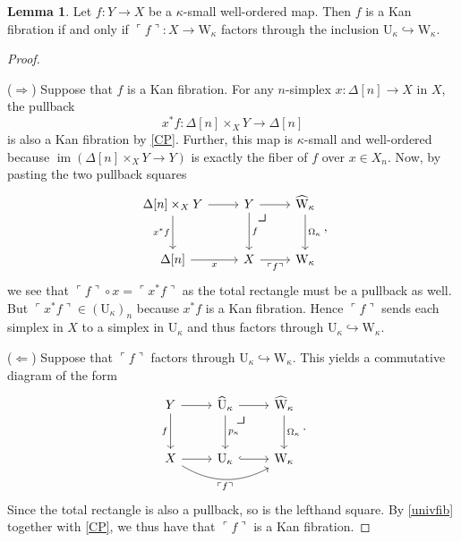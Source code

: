 \documentclass[10pt,letterpaper,cm]{nupset}
\theoremstyle{definition}
\theoremstyle{theorem}
\newtheorem{lemma}[definition]{Lemma}
\theoremstyle{remark}
\DeclareMathOperator{\im}{im}
\newcommand{\0}{\mathbf{0}}
\newcommand{\1}{\mathbf{1}}
\newcommand{\2}{\mathbf{2}}
\begin{document}
\begin{lemma}\label{fibfactors}
Let $f: Y \to X$ be a $\kappa$-small well-ordered map. Then $f$ is a Kan fibration if and only if $\ulcorner{f}\urcorner : X \to  \mathrm{W}_{\kappa}$ factors through the inclusion $\mathrm{U}_{\kappa} \hookrightarrow \mathrm{W}_{\kappa}$. 
\end{lemma}
\begin{proof} $ $
\smallskip

($\Longrightarrow$)  Suppose that $f$ is a Kan fibration.  For any $n$-simplex $x : \Delta[n] \to X$ in $X$, the pullback $$x^{\ast}{f} : \Delta[n] \times_X Y \to \Delta[n]$$ is also a Kan fibration by \cref{CP}. Further, this map is $\kappa$-small and well-ordered because  $\im\left(\Delta[n] \times_X Y \to Y\right)$ is exactly the fiber of $f$ over $x \in X_n$.  Now, by pasting the two pullback squares
\[
\begin{tikzcd}[row sep=large]
{\Delta[n]\times_XY} \arrow[d, "x^{\ast}{f}"'] \arrow[r] & Y \arrow[d, "f"] \arrow[r]    \arrow[dr, phantom, "\scalebox{1.5}{\color{black}$\lrcorner$}" , very near start, color=black]            & \widehat{\mathrm{W}}_{\kappa} \arrow[d, "\Omega_{\kappa}"] \\
{\Delta[n]} \arrow[r, "x"']                              & X \arrow[r, "\ulcorner{f}\urcorner"'] & \mathrm{W}_{\kappa}                                       
\end{tikzcd}, 
\] we see that $ \ulcorner{f}\urcorner \circ x = \ulcorner{x^{\ast}{f}}\urcorner$ as the total rectangle must be a pullback as well. But $ \ulcorner{x^{\ast}{f}}\urcorner \in \left(\mathrm{U}_{\kappa}\right)_n$ because $x^{\ast}{f}$ is a Kan fibration. Hence  $ \ulcorner{f}\urcorner$ sends each simplex in $X$ to a simplex  in $\mathrm{U}_{\kappa}$ and thus factors through $\mathrm{U}_{\kappa} \hookrightarrow \mathrm{W}_{\kappa}$.

\medskip

($\Longleftarrow$) Suppose that $\ulcorner{f}\urcorner$ factors through $\mathrm{U}_{\kappa} \hookrightarrow \mathrm{W}_{\kappa}$. This yields a commutative diagram of the form
\[
\begin{tikzcd}[row sep=large]
Y \arrow[d, "f"'] \arrow[r]                                  & \widehat{\mathrm{U}}_{\kappa} \arrow[d, "p_{\kappa}"] \arrow[r] 
 \arrow[dr, phantom, "\scalebox{1.5}{\color{black}$\lrcorner$}" , very near start, color=black]  
  & \widehat{\mathrm{W}}_{\kappa} \arrow[d, "\Omega_{\kappa}"] \\
X \arrow[r] \arrow[rr, "\ulcorner{f}\urcorner"', bend right] & \mathrm{U}_{\kappa} \arrow[r, hook]                             & \mathrm{W}_{\kappa}                                       
\end{tikzcd}
.\] Since the total rectangle is also a pullback, so is the lefthand square. By \cref{univfib} together with \cref{CP}, we thus have that $\ulcorner{f}\urcorner$ is a Kan fibration. 
\end{proof}
\end{document}
